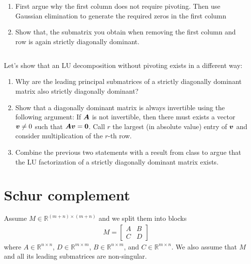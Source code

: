 \documentclass[11pt,letterpaper]{article}
\begin{document}
\begin{enumerate}
    \item First argue why the first column does not require pivoting. Then use Gaussian elimination to generate the required zeros in the first column
    \item Show that, the submatrix you obtain when removing the first column and row is again strictly  diagonally dominant.
\end{enumerate}

\subsection{}
Let's show that an LU decomposition without pivoting exists in a different way:
  \begin{enumerate}
    \item Why are the leading principal submatrices of a strictly
      diagonally dominant matrix also strictly diagonally dominant?
    \item Show that a diagonally dominant matrix is always invertible
      using the following argument: If $\boldsymbol{A}$ is not invertible, then
      there must exists a vector $\boldsymbol{v}\not=0$ such that
      $\boldsymbol{A}\boldsymbol{v} = \boldsymbol{0}$. Call $r$ the largest (in
      absolute value) entry of $\boldsymbol{v}$ and consider
      multiplication of the $r$-th row. 
    \item Combine the previous two statements with a result from class
      to argue that the LU factorization of a strictly diagonally
      dominant matrix exists.
 \end{enumerate}

\section{Schur complement}
Assume $M\in \mathbb{R}^{(m+n)\times(m+n)}$ and we split them into blocks
\begin{align*}
    M = \begin{bmatrix}
    A &B\\
    C &D
    \end{bmatrix}
\end{align*}
where $A\in\mathbb{R}^{n\times n}$, $D\in\mathbb{R}^{m\times m}$, $B\in\mathbb{R}^{n\times m}$, and $C\in\mathbb{R}^{m\times n}$. We also assume that $M$ and all its leading submatrices are non-singular. 
\end{document}

